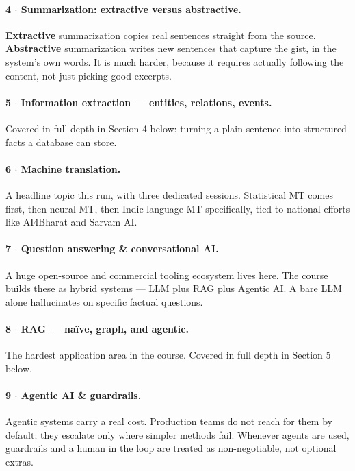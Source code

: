 \documentclass[a4paper,11pt]{article}
\newcommand{\vocab}[1]{\textbf{#1}}
\begin{document}
\paragraph{4 $\cdot$ Summarization: extractive versus abstractive.}
\vocab{Extractive} summarization copies real sentences straight from the
source. \vocab{Abstractive} summarization writes new sentences that capture
the gist, in the system's own words. It is much harder, because it
requires actually following the content, not just picking good excerpts.

\paragraph{5 $\cdot$ Information extraction --- entities, relations, events.}
Covered in full depth in Section 4 below: turning a plain sentence into
structured facts a database can store.

\paragraph{6 $\cdot$ Machine translation.}
A headline topic this run, with three dedicated sessions. Statistical MT
comes first, then neural MT, then Indic-language MT specifically, tied to
national efforts like AI4Bharat and Sarvam AI.

\paragraph{7 $\cdot$ Question answering \& conversational AI.}
A huge open-source and commercial tooling ecosystem lives here. The course
builds these as hybrid systems --- LLM plus RAG plus Agentic AI. A bare
LLM alone hallucinates on specific factual questions.

\paragraph{8 $\cdot$ RAG --- na\"ive, graph, and agentic.}
The hardest application area in the course. Covered in full depth in
Section 5 below.

\paragraph{9 $\cdot$ Agentic AI \& guardrails.}
Agentic systems carry a real cost. Production teams do not reach for them
by default; they escalate only where simpler methods fail. Whenever agents
are used, guardrails and a human in the loop are treated as non-negotiable,
not optional extras.
\end{document}
